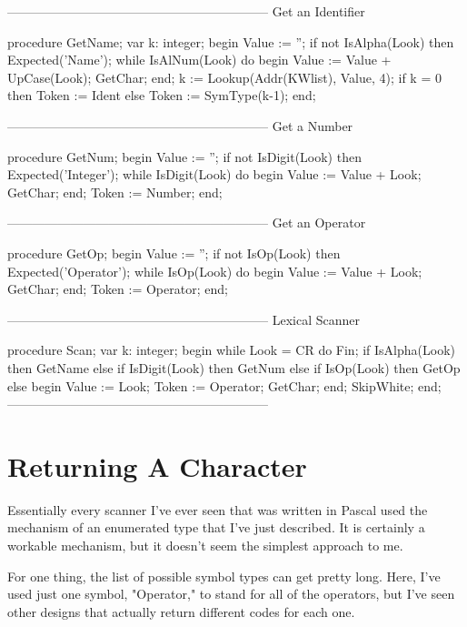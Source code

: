 \documentclass[float=false, crop=false]{standalone}
\begin{document}
\begin{code}
{--------------------------------------------------------------}
{ Get an Identifier }

procedure GetName;
var k: integer;
begin
   Value := '';
   if not IsAlpha(Look) then Expected('Name');
   while IsAlNum(Look) do begin
     Value := Value + UpCase(Look);
     GetChar;
   end;
   k := Lookup(Addr(KWlist), Value, 4);
   if k = 0 then
      Token := Ident
   else
      Token := SymType(k-1);
end;

{--------------------------------------------------------------}
{ Get a Number }

procedure GetNum;
begin
   Value := '';
   if not IsDigit(Look) then Expected('Integer');
   while IsDigit(Look) do begin
     Value := Value + Look;
     GetChar;
   end;
   Token := Number;
end;


{--------------------------------------------------------------}
{ Get an Operator }

procedure GetOp;
begin
   Value := '';
   if not IsOp(Look) then Expected('Operator');
   while IsOp(Look) do begin
     Value := Value + Look;
     GetChar;
   end;
   Token := Operator;
end;


{--------------------------------------------------------------}
{ Lexical Scanner }

procedure Scan;
var k: integer;
begin
   while Look = CR do
      Fin;
   if IsAlpha(Look) then
      GetName
   else if IsDigit(Look) then
      GetNum
   else if IsOp(Look) then
      GetOp
   else begin
      Value := Look;
      Token := Operator;
      GetChar;
   end;
   SkipWhite;
end;
{--------------------------------------------------------------}
\end{code}

\section{Returning A Character}

Essentially every scanner I've ever seen that was written in Pascal used the
mechanism of an enumerated type that I've just described. It is certainly a
workable mechanism, but it doesn't seem the simplest approach to me.

For one thing, the list of possible symbol types can get pretty long. Here, I've
used just one symbol, "Operator," to stand for all of the operators, but I've
seen other designs that actually return different codes for each one.
\end{document}
